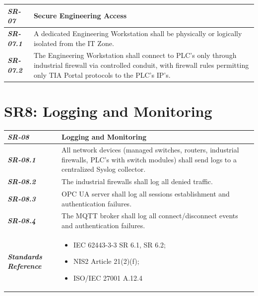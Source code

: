 \documentclass{report}
\begin{document}
\begin{tabularx}{\textwidth}{>{\bfseries}p{2.5cm} X}
    \textit{SR-07} & \textbf{Secure Engineering Access} \vspace{0.5em}\\
\toprule
\textit{SR-07.1} &
    A dedicated Engineering Workstation shall be physically or logically isolated from the IT Zone.
    \vspace{0.5em}
\\
\textit{SR-07.2} &
    The Engineering Workstation shall connect to PLC's only through industrial firewall via controlled conduit, with firewall rules permitting only TIA Portal protocols to the PLC's IP's. 
    \vspace{0.5em}
    \\
\end{tabularx}
\vspace{2em}

\section{SR8: Logging and Monitoring}\label{SR8:logging}

\begin{tabularx}{\textwidth}{>{\bfseries}p{2.5cm} X}
    \textit{SR-08} & \textbf{Logging and Monitoring} \vspace{0.5em}\\
\toprule
\textit{SR-08.1} &
    All network devices (managed switches, routers, industrial firewalls, PLC's with switch modules) shall send logs to a centralized Syslog collector.
    \vspace{0.5em}
\\
\textit{SR-08.2} &
    The industrial firewalls shall log all denied traffic.
    \vspace{0.5em}
    \\
\textit{SR-08.3} &
    OPC UA server shall log all sessions establishment and authentication failures.
    \vspace{0.5em}
    \\
\textit{SR-08.4} &
    The MQTT broker shall log all connect/disconnect events and authentication failures.
    \vspace{0.5em}
    \\
\midrule
    \textit{Standards Reference} &
\begin{itemize}[label=-, noitemsep, topsep=0pt, leftmargin=*]
    \item IEC 62443-3-3 SR 6.1, SR 6.2;
    \item NIS2 Article 21(2)(f); 
    \item ISO/IEC 27001 A.12.4
\end{itemize} \vspace{1em} \\ 
\end{tabularx}
\vspace{2em}
\end{document}
